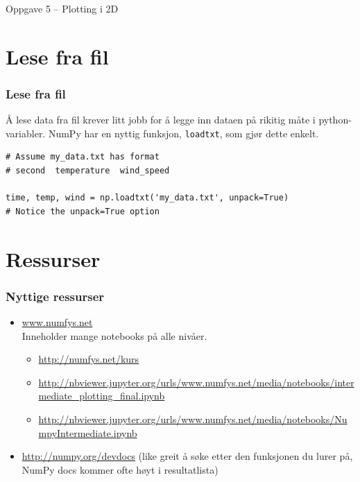 \documentclass{beamer}
\begin{document}
\begin{frame}
  \begin{block}{Oppgave 5 -- Plotting i 2D}\end{block}
\end{frame}

\section{Lese fra fil}
\begin{frame}[fragile]
  \frametitle{Lese fra fil}

  Å lese data fra fil krever litt jobb for å legge inn dataen på rikitig måte i python-variabler.
  NumPy har en nyttig funksjon, \lstinline{loadtxt}, som gjør dette enkelt.
  \begin{lstlisting}
# Assume my_data.txt has format
# second  temperature  wind_speed

time, temp, wind = np.loadtxt('my_data.txt', unpack=True)
# Notice the unpack=True option
  \end{lstlisting}
\end{frame}


\section{Ressurser}
\begin{frame}
  \frametitle{Nyttige ressurser}
  \begin{itemize}
  \item \url{www.numfys.net}\\
    Inneholder mange notebooks på alle nivåer.
    \begin{itemize}
    \item \url{http://numfys.net/kurs}
    \item \url{http://nbviewer.jupyter.org/urls/www.numfys.net/media/notebooks/intermediate_plotting_final.ipynb}
    \item \url{http://nbviewer.jupyter.org/urls/www.numfys.net/media/notebooks/NumpyIntermediate.ipynb}
    \end{itemize}

  \item \url{http://numpy.org/devdocs} (like greit å søke etter den funksjonen du lurer på, NumPy docs kommer ofte høyt i resultatlista)
  \end{itemize}
\end{frame}
\end{document}
